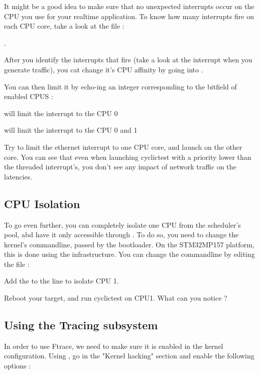 It might be a good idea to make sure that no unexpected interrupts occur on the CPU
you use for your realtime application. To know how many interrupts fire on each CPU
core, take a look at the  file :

.

After you identify the interrupts that fire (take a look at the  interrupt
when you generate traffic), you cat change it's CPU affinity by going into .

You can then limit it by echo-ing an integer corresponding to the bitfield of enabled CPUS :

 will limit the interrupt to the CPU 0

 will limit the interrupt to the CPU 0 and 1

Try to limit the ethernet interrupt to one CPU core, and launch  on the
other core. You can see that even when launching cyclictest with a priority lower than
the threaded interrupt's, you don't see any impact of network traffic on the latencies.

\subsection{CPU Isolation}

To go even further, you can completely isolate one CPU from the scheduler's pool,
abd have it only accessible through . To do so, you need to change
the kernel's commandline, passed by the bootloader. On the STM32MP157 platform,
this is done using the  infrastructure. You can change the
commandline by editing the  file :


Add the  to the  line to isolate CPU 1.

Reboot your target, and run cyclictest on CPU1. What can you notice ?

\subsection{Using the Tracing subsystem}

In order to use Ftrace, we need to make sure it is enabled in the kernel
configuration. Using , go in the "Kernel hacking" section
and enable the following options :

